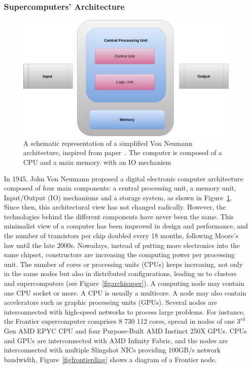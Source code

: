 \subsubsection{Supercomputers' Architecture}

\begin{figure}[hb]\centering
\includegraphics[scale=0.2]{figures/CPU.pdf}
\caption{A schematic representation of a simplified Von Neumann architecture, inspired from paper~\cite{shankar_looking_2017}. The computer is composed of a CPU and a main memory. with an IO mechanism}
\label{figarchivon}
\end{figure}

In 1945, John Von Neumann proposed a digital electronic computer architecture composed of four main components:  a central processing unit, a memory unit, Input/Output (IO) mechanisms and a storage system, as shown in Figure~\ref{figarchivon}. 
Since then, this architectural view has not changed radically. However, the technologies behind the different components have never been the same. 
This minimalist view of a computer has been improved in design and performance, and the number of transistors per chip doubled every 18 months, following Moore's law until the late 2000s. 
Nowadays, instead of putting more electronics into the same chipset, constructors are increasing the computing power per processing unit. The number of cores or processing units (CPUs) keeps increasing, not only in the same nodes but also in distributed configurations, leading us to clusters and supercomputers (see Figure~\ref{figarchisuper}). 
A computing node may contain one CPU socket or more. A CPU is usually a multicore. A node may also contain accelerators such as graphic processing units (GPUs). Several nodes are interconnected with high-speed networks to process large problems. 
For instance, the Frontier supercomputer comprises 8 730 112 cores, spread in nodes of one $3^{rd}$ Gen AMD EPYC CPU and four Purpose-Built AMD Instinct 250X GPUs. CPUs and GPUs are interconnected with AMD Infinity Fabric, and the nodes are interconnected with multiple Slingshot NICs providing 100GB/s network bandwidth\cite{frontier}, Figure~\ref{figfrontierdiag} shows a diagram of a Frontier node. 

